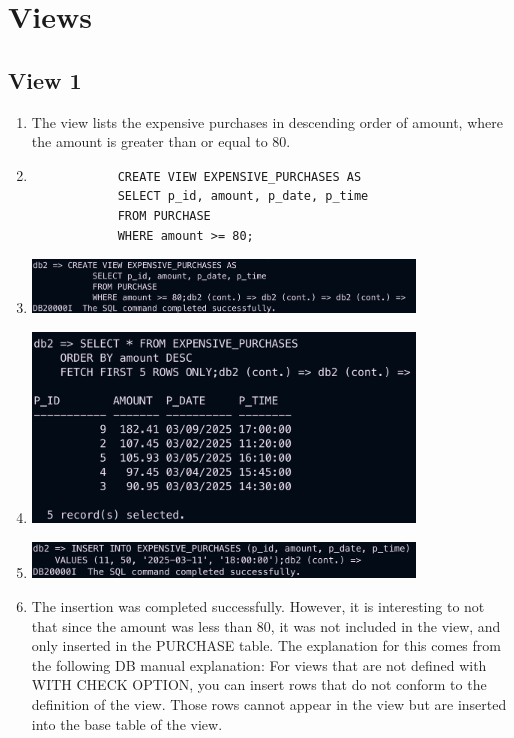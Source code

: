 \documentclass[a4paper,11pt]{article}
\begin{document}
\section{Views}

\subsection*{View 1}

\begin{enumerate}[label=(\alph*)]
    \item The view lists the expensive purchases in descending order of amount, where the amount is greater than or equal to 80.
    \item
        \begin{lstlisting}
            CREATE VIEW EXPENSIVE_PURCHASES AS
            SELECT p_id, amount, p_date, p_time
            FROM PURCHASE
            WHERE amount >= 80;
        \end{lstlisting}
    \item
        \includegraphics[width=0.8\textwidth]{View1.png}
    \item
        \includegraphics[width=0.8\textwidth]{View1_d.png}
    \item
        \includegraphics[width=0.8\textwidth]{View1_e.png}
    \item The insertion was completed successfully. However, it is interesting to not that since the amount
    was less than 80, it was not included in the view, and only inserted in the PURCHASE table.
    The explanation for this comes from the following DB manual explanation: For views that are not defined with WITH CHECK OPTION, you can insert rows that do not conform to the definition of the view. Those rows cannot appear in the view but are inserted into the base table of the view.
\end{enumerate}
\end{document}
